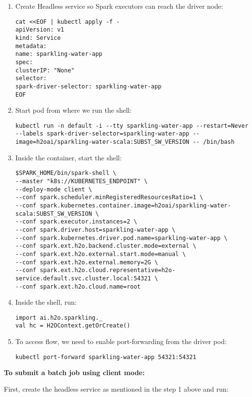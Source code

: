 \begin{enumerate}
    \item Create Headless service so Spark executors can reach the driver node:
    \begin{lstlisting}[style=Bash]
cat <<EOF | kubectl apply -f -
apiVersion: v1
kind: Service
metadata:
name: sparkling-water-app
spec:
clusterIP: "None"
selector:
spark-driver-selector: sparkling-water-app
EOF
    \end{lstlisting}
    \item Start pod from where we run the shell:
    \begin{lstlisting}[style=Bash]
kubectl run -n default -i --tty sparkling-water-app --restart=Never --labels spark-driver-selector=sparkling-water-app --image=h2oai/sparkling-water-scala:SUBST_SW_VERSION -- /bin/bash
    \end{lstlisting}
    \item Inside the container, start the shell:
    \begin{lstlisting}[style=Bash]
$SPARK_HOME/bin/spark-shell \
--master "k8s://KUBERNETES_ENDPOINT" \
--deploy-mode client \
--conf spark.scheduler.minRegisteredResourcesRatio=1 \
--conf spark.kubernetes.container.image=h2oai/sparkling-water-scala:SUBST_SW_VERSION \
--conf spark.executor.instances=2 \
--conf spark.driver.host=sparkling-water-app \
--conf spark.kubernetes.driver.pod.name=sparkling-water-app \
--conf spark.ext.h2o.backend.cluster.mode=external \
--conf spark.ext.h2o.external.start.mode=manual \
--conf spark.ext.h2o.external.memory=2G \
--conf spark.ext.h2o.cloud.representative=h2o-service.default.svc.cluster.local:54321 \
--conf spark.ext.h2o.cloud.name=root
    \end{lstlisting}
    \item Inside the shell, run:
    \begin{lstlisting}[style=Scala]
import ai.h2o.sparkling._
val hc = H2OContext.getOrCreate()
    \end{lstlisting}
    \item To access flow, we need to enable port-forwarding from the driver pod:
    \begin{lstlisting}[style=Bash]
kubectl port-forward sparkling-water-app 54321:54321
    \end{lstlisting}
\end{enumerate}

\textbf{To submit a batch job using client mode:}

First, create the headless service as mentioned in the step 1 above and run:

